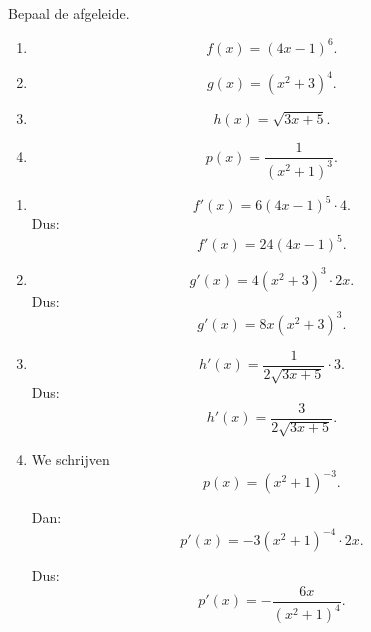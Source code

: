 \documentclass{ximera}
\begin{document}
\begin{oefening}{\oefB\ESS}

Bepaal de afgeleide.

\begin{enumerate}
  \item \[f(x)=(4x-1)^6.\]
  \item \[g(x)=(x^2+3)^4.\]
  \item \[h(x)=\sqrt{3x+5}.\]
  \item \[p(x)=\frac{1}{(x^2+1)^3}.\]
\end{enumerate}

\begin{oplossing}
\begin{enumerate}
  \item
  \[
  f'(x)=6(4x-1)^5\cdot4.
  \]
  Dus:
  \[\boxed{f'(x)=24(4x-1)^5.}\]

  \item
  \[
  g'(x)=4(x^2+3)^3\cdot2x.
  \]
  Dus:
  \[\boxed{g'(x)=8x(x^2+3)^3.}\]

  \item
  \[
  h'(x)=\frac{1}{2\sqrt{3x+5}}\cdot3.
  \]
  Dus:
  \[\boxed{h'(x)=\frac{3}{2\sqrt{3x+5}}.}\]

  \item We schrijven
  \[p(x)=(x^2+1)^{-3}.\]

  Dan:
  \[
  p'(x)
  =
  -3(x^2+1)^{-4}\cdot2x.
  \]

  Dus:
  \[\boxed{p'(x)=-\frac{6x}{(x^2+1)^4}.}\]
\end{enumerate}
\end{oplossing}
\end{oefening}
\end{document}
